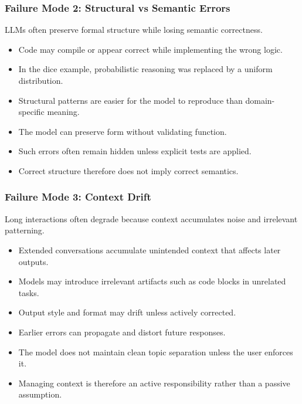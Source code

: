 \documentclass{beamer}
\begin{document}
\frame
{
   \frametitle{Failure Mode 2: Structural vs Semantic Errors}

    LLMs often preserve formal structure while losing semantic correctness.

    \begin{itemize}
        \item Code may compile or appear correct while implementing the wrong logic.
        \item In the dice example, probabilistic reasoning was replaced by a uniform distribution.
        \item Structural patterns are easier for the model to reproduce than domain-specific meaning.
        \item The model can preserve form without validating function.
        \item Such errors often remain hidden unless explicit tests are applied.
        \item Correct structure therefore does not imply correct semantics.
    \end{itemize}
}

\frame
{
   \frametitle{Failure Mode 3: Context Drift}

    Long interactions often degrade because context accumulates noise and irrelevant patterning.

    \begin{itemize}
        \item Extended conversations accumulate unintended context that affects later outputs.
        \item Models may introduce irrelevant artifacts such as code blocks in unrelated tasks.
        \item Output style and format may drift unless actively corrected.
        \item Earlier errors can propagate and distort future responses.
        \item The model does not maintain clean topic separation unless the user enforces it.
        \item Managing context is therefore an active responsibility rather than a passive assumption.
    \end{itemize}
}
\end{document}
